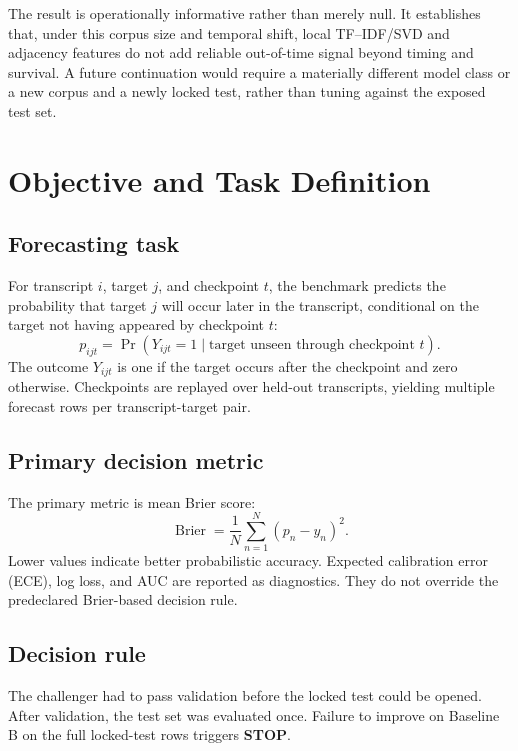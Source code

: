 \documentclass[10pt,a4paper]{article}
\begin{document}
The result is operationally informative rather than merely null. It establishes
that, under this corpus size and temporal shift, local TF--IDF/SVD and adjacency
features do not add reliable out-of-time signal beyond timing and survival. A
future continuation would require a materially different model class or a new
corpus and a newly locked test, rather than tuning against the exposed test set.

\vspace{2mm}
\tableofcontents
\clearpage
{}
\setcounter{page}{1}

\section{Objective and Task Definition}

\subsection{Forecasting task}
For transcript \(i\), target \(j\), and checkpoint \(t\), the benchmark predicts
the probability that target \(j\) will occur later in the transcript, conditional
on the target not having appeared by checkpoint \(t\):
\[
  p_{ijt} =
  \Pr\!\left(Y_{ijt}=1 \mid \text{target unseen through checkpoint }t\right).
\]
The outcome \(Y_{ijt}\) is one if the target occurs after the checkpoint and zero
otherwise. Checkpoints are replayed over held-out transcripts, yielding multiple
forecast rows per transcript-target pair.

\subsection{Primary decision metric}
The primary metric is mean Brier score:
\[
  \operatorname{Brier}
  = \frac{1}{N}\sum_{n=1}^{N}(p_n-y_n)^2.
\]
Lower values indicate better probabilistic accuracy. Expected calibration error
(ECE), log loss, and AUC are reported as diagnostics. They do not override the
predeclared Brier-based decision rule.

\subsection{Decision rule}
The challenger had to pass validation before the locked test could be opened.
After validation, the test set was evaluated once. Failure to improve on Baseline B
on the full locked-test rows triggers \textbf{STOP}.
\end{document}
